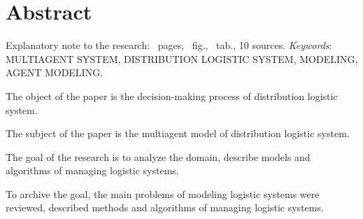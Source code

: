 \section*{Abstract}
Explanatory note to the research: \pageref{LastPage}~pages, \totalfigures~fig., \totaltables~tab., 10 sources. \bigbreak 
\textit{Keywords}: \MakeUppercase{multiagent system, distribution logistic system, modeling, agent modeling}. \bigbreak 

The object of the paper is the decision-making process of distribution logistic system.

The subject of the paper is the multiagent model of  distribution logistic system.

The goal of the research is to analyze the domain, describe models and algorithms of managing logistic systems.

To archive the goal, the main problems of modeling logistic systems were reviewed, described methods and algorithms of managing logistic systems.
